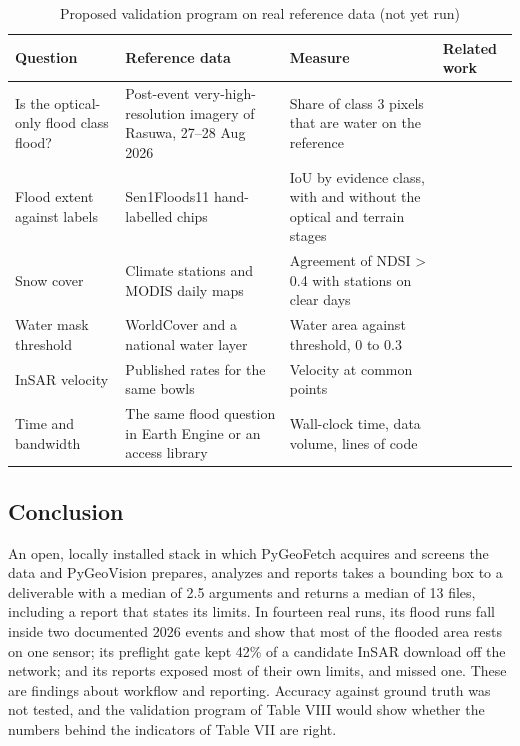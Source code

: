 \documentclass[conference]{IEEEtran}
\newlength{\tabw}
\begin{document}
\begin{table}[!t]
\caption{Proposed validation program on real reference data (not yet run)}
\centering
{\footnotesize\setlength{\tabcolsep}{2.5pt}\renewcommand{\arraystretch}{1.12}\setlength{\tabw}{\dimexpr\textwidth-8\tabcolsep\relax}
\begin{tabular}{>{\raggedright\arraybackslash}p{}>{\raggedright\arraybackslash}p{}>{\raggedright\arraybackslash}p{}>{\raggedright\arraybackslash}p{}}
\toprule
\textbf{Question} & \textbf{Reference data} & \textbf{Measure} & \textbf{Related work} \\
\midrule
Is the optical-only flood class flood? & Post-event very-high-resolution imagery of Rasuwa, 27--28 Aug 2026 \cite{roy2026nepalfloods} & Share of class 3 pixels that are water on the reference & \cite{cems2026emsr927} \\
Flood extent against labels & Sen1Floods11 hand-labelled chips \cite{bonafilia2020sen1floods11} & IoU by evidence class, with and without the optical and terrain stages & \cite{twele2016flood,uddin2019bangladesh} \\
Snow cover & Climate stations and MODIS daily maps & Agreement of NDSI > 0.4 with stations on clear days & \cite{tong2020snow} \\
Water mask threshold & WorldCover and a national water layer & Water area against threshold, 0 to 0.3 & \cite{mcfeeters1996ndwi,zanaga2022worldcover} \\
InSAR velocity & Published rates for the same bowls & Velocity at common points & \cite{cigna2021mexico} \\
Time and bandwidth & The same flood question in Earth Engine or an access library & Wall-clock time, data volume, lines of code & \cite{gorelick2017gee,unspider2026flood} \\
\bottomrule
\end{tabular}
}
\end{table}

\subsection{Conclusion}

An open, locally installed stack in which PyGeoFetch acquires and screens the data and PyGeoVision prepares, analyzes and reports takes a bounding box to a deliverable with a median of 2.5 arguments and returns a median of 13 files, including a report that states its limits. In fourteen real runs, its flood runs fall inside two documented 2026 events and show that most of the flooded area rests on one sensor; its preflight gate kept 42\% of a candidate InSAR download off the network; and its reports exposed most of their own limits, and missed one. These are findings about workflow and reporting. Accuracy against ground truth was not tested, and the validation program of Table VIII would show whether the numbers behind the indicators of Table VII are right.
\end{document}
